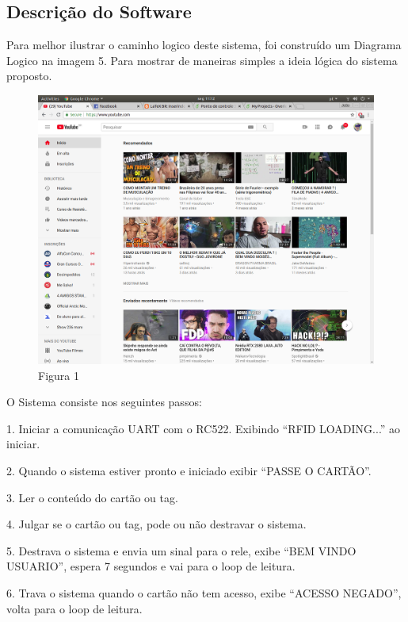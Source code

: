 \documentclass[conference,compsoc]{IEEEtran}
\newcommand\tab[1][0.75cm]{\hspace*{#1}}
\begin{document}
\subsection{Descrição do Software}
Para melhor ilustrar o caminho logico deste sistema, foi construído um Diagrama Logico na imagem 5. Para mostrar de maneiras simples a ideia lógica do sistema proposto.
 \begin{figure}[!ht]
		\centering
		\includegraphics[scale=0.15]{nome_da_figura1.png}
		\caption{Figura 1}
\end{figure}

O Sistema consiste nos seguintes passos:

\tab 1. Iniciar a comunicação UART com o RC522. Exibindo “RFID LOADING...” ao iniciar.

\tab 2. Quando o sistema estiver pronto e iniciado exibir “PASSE O CARTÃO”.

\tab 3. Ler o conteúdo do cartão ou tag.

\tab 4. Julgar se o cartão ou tag, pode ou não destravar o sistema.

\tab 5. Destrava o sistema e envia um sinal para o rele, exibe  “BEM VINDO USUARIO”, espera 7 segundos e vai para o loop de leitura.

\tab 6. Trava o sistema quando o cartão não tem acesso, exibe “ACESSO NEGADO”, volta para o loop de leitura. 
\end{document}
